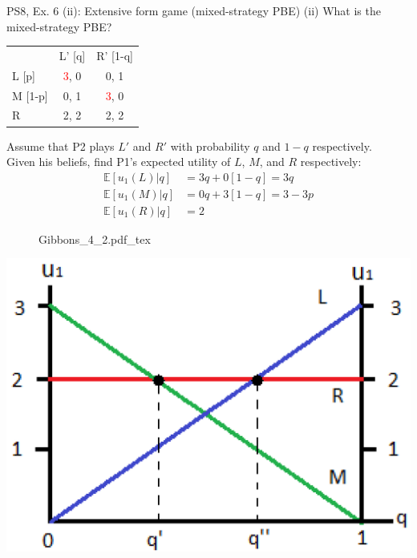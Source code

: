 \begin{frame}{PS8, Ex. 6 (ii): Extensive form game (mixed-strategy PBE)}
    (ii) What is the mixed-strategy PBE? \vspace{-8pt}
    \begin{multicols}{2}
      \begin{table}
        \begin{tabular}{l|c|c|}
          \multicolumn{1}{c}{} & \multicolumn{1}{c}{L' [q]} & \multicolumn{1}{c}{R' [1-q]} \\\cline{2-3}
          L [p]   & \textcolor{red}{3}, 0 & 0, \color{blue}1 \\\cline{2-3}
          M [1-p] & 0, \color{blue}1 & \textcolor{red}{3}, 0 \\\cline{2-3}
          R       & 2, \color{blue}2 & 2, \color{blue}2 \\\cline{2-3}
        \end{tabular}
      \end{table} \vspace{-4pt}
      Assume that P2 plays $L'$ and $R'$ with probability $q$ and $1-q$ respectively.\\\smallskip
      Given his beliefs, find P1's expected utility of $L$, $M$, and $R$ respectively: \vspace{-4pt}
      \begin{align*}
        \mathbb{E}[u_1(L)|q]&=3q+0[1-q]=3q\\
        \mathbb{E}[u_1(M)|q]&=0q+3[1-q]=3-3p\\
        \mathbb{E}[u_1(R)|q]&=2
      \end{align*}
      \vfill\null\columnbreak
      \begin{figure}[!h]
        \center {}
        {Gibbons_4_2.pdf_tex}
      \end{figure}
      \includegraphics[width=1.1\columnwidth]{figures/Gibbons_4_2_E[u]}
      \vfill\null
    \end{multicols}
\end{frame}

